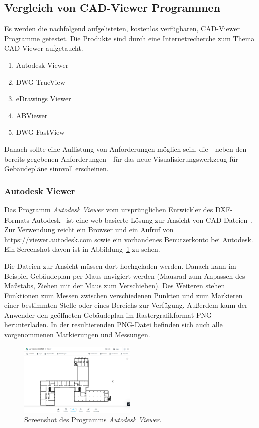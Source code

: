\subsection{Vergleich von CAD-Viewer Programmen}
\label{subsec:comparison-cad-viewer}

Es werden die nachfolgend aufgelisteten, kostenlos verfügbaren, CAD-Viewer Programme getestet.
Die Produkte sind durch eine Internetrecherche zum Thema CAD-Viewer aufgetaucht.

\begin{enumerate}
    \item Autodesk Viewer
    \item DWG TrueView
    \item eDrawings Viewer
    \item ABViewer
    \item DWG FastView
\end{enumerate}

Danach sollte eine Auflistung von Anforderungen möglich sein, die - neben den bereits gegebenen Anforderungen - für das neue Visualisierungswerkzeug für Gebäudepläne sinnvoll erscheinen.

\subsubsection{Autodesk Viewer}
\label{subsubsec:autodesk-viewer}

Das Programm \textit{Autodesk Viewer} vom ursprünglichen Entwickler des DXF-Formats Autodesk~\cite{DXFReference} ist eine web-basierte Lösung zur Ansicht von CAD-Dateien~\cite{AutodeskViewer}.
Zur Verwendung reicht ein Browser und ein Aufruf von https://viewer.autodesk.com sowie ein vorhandenes Benutzerkonto bei Autodesk.
Ein Screenshot davon ist in Abbildung~\ref{fig:autodesk-viewer} zu sehen.

Die Dateien zur Ansicht müssen dort hochgeladen werden.
Danach kann im Beispiel Gebäudeplan per Maus navigiert werden (Mausrad zum Anpassen des Maßstabs, Ziehen mit der Maus zum Verschieben).
Des Weiteren stehen Funktionen zum Messen zwischen verschiedenen Punkten und zum Markieren einer bestimmten Stelle oder eines Bereichs zur Verfügung.
Außerdem kann der Anwender den geöffneten Gebäudeplan im Rastergrafikformat PNG herunterladen.
In der resultierenden PNG-Datei befinden sich auch alle vorgenommenen Markierungen und Messungen.

\begin{figure}
    \includegraphics[width=0.5\textwidth]{res/autodesk-viewer.png}
    \caption{Screenshot des Programms \textit{Autodesk Viewer}.}
    \label{fig:autodesk-viewer}
\end{figure}

